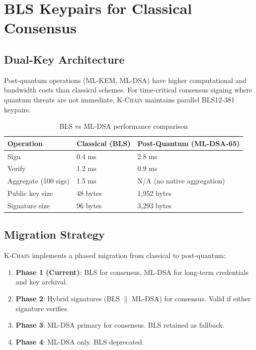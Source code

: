 \documentclass[11pt,letterpaper]{article}
\theoremstyle{definition}
\theoremstyle{remark}
\newcommand{\KChain}{\textsc{K-Chain}}
\begin{document}
\section{BLS Keypairs for Classical Consensus}

\subsection{Dual-Key Architecture}

Post-quantum operations (ML-KEM, ML-DSA) have higher computational and bandwidth costs than classical schemes. For time-critical consensus signing where quantum threats are not immediate, \KChain{} maintains parallel BLS12-381 keypairs.

\begin{table}[h]
\centering
\begin{tabular}{lll}
\toprule
\textbf{Operation} & \textbf{Classical (BLS)} & \textbf{Post-Quantum (ML-DSA-65)} \\
\midrule
Sign & 0.4 ms & 2.8 ms \\
Verify & 1.2 ms & 0.9 ms \\
Aggregate (100 sigs) & 1.5 ms & N/A (no native aggregation) \\
Public key size & 48 bytes & 1,952 bytes \\
Signature size & 96 bytes & 3,293 bytes \\
\bottomrule
\end{tabular}
\caption{BLS vs ML-DSA performance comparison}
\label{tab:bls-vs-mldsa}
\end{table}

\subsection{Migration Strategy}

\KChain{} implements a phased migration from classical to post-quantum:

\begin{enumerate}
\item \textbf{Phase 1 (Current)}: BLS for consensus, ML-DSA for long-term credentials and key archival.
\item \textbf{Phase 2}: Hybrid signatures (BLS $\|$ ML-DSA) for consensus. Valid if either signature verifies.
\item \textbf{Phase 3}: ML-DSA primary for consensus. BLS retained as fallback.
\item \textbf{Phase 4}: ML-DSA only. BLS deprecated.
\end{enumerate}
\end{document}

